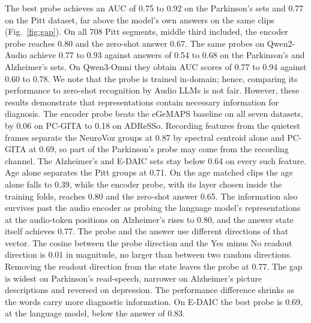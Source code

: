 \documentclass{article}
\begin{document}
The best probe achieves an AUC of 0.75 to 0.92 on the Parkinson's sets and 0.77 on the Pitt dataset, far above the model's own answers on the same clips (Fig.~\ref{fig:gap}).  On all 708 Pitt segments, middle third included, the encoder probe reaches 0.80 and the zero-shot answer 0.67. The same probes on Qwen2-Audio achieve 0.77 to 0.93 against answers of 0.54 to 0.68 on the Parkinson's and Alzheimer's sets. On Qwen3-Omni they obtain AUC scores of 0.77 to 0.94 against 0.60 to 0.78. We note that the probe is trained in-domain; hence, comparing its performance to zero-shot recognition by Audio LLMs is not fair. However, these results demonstrate that representations contain necessary information for diagnosis. The encoder probe beats the eGeMAPS baseline on all seven datasets, by 0.06 on PC-GITA to 0.18 on ADReSSo.  Recording features from the quietest frames separate the NeuroVoz groups at 0.87 by spectral centroid alone and PC-GITA at 0.69, so part of the Parkinson's probe may come from the recording channel. The Alzheimer's and E-DAIC sets stay below 0.64 on every such feature. Age alone separates the Pitt groups at 0.71. On the age matched clips the age alone falls to 0.39, while the encoder probe, with its layer chosen inside the training folds, reaches 0.80 and the zero-shot answer 0.65. The information also survives past the audio encoder as probing the language model's representations at the audio-token positions on Alzheimer's rises to 0.80, and the answer state itself achieves 0.77. The probe and the answer use different directions of that vector. The cosine between the probe direction and the Yes minus No readout direction is 0.01 in magnitude, no larger than between two random directions. Removing the readout direction from the state leaves the probe at 0.77. The gap is widest on Parkinson's read-speech, narrower on Alzheimer's picture descriptions and reversed on depression. The performance difference shrinks as the words carry more diagnostic information. On E-DAIC the best probe is 0.69, at the language model, below the answer of 0.83.

\end{document}
